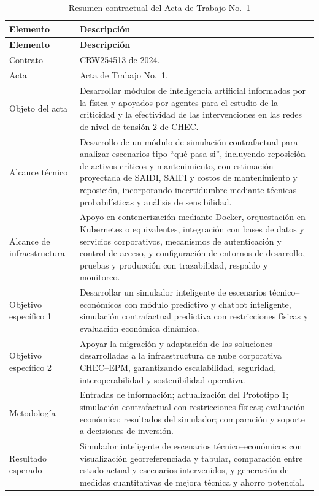 \documentclass[11pt,a4paper]{article}
\begin{document}
\begin{small}
\begin{xltabular}{\textwidth}{L{4.2cm} X}
\caption{Resumen contractual del Acta de Trabajo No.~1}
\label{tab:contractual}\\
\toprule
\textbf{Elemento} & \textbf{Descripción} \\
\midrule
\endfirsthead
\toprule
\textbf{Elemento} & \textbf{Descripción} \\
\midrule
\endhead
\bottomrule
\endfoot
Contrato & CRW254513 de 2024. \\
Acta & Acta de Trabajo No.~1. \\
Objeto del acta & Desarrollar módulos de inteligencia artificial informados por la física y apoyados por agentes para el estudio de la criticidad y la efectividad de las intervenciones en las redes de nivel de tensión 2 de CHEC. \\
Alcance técnico & Desarrollo de un módulo de simulación contrafactual para analizar escenarios tipo ``qué pasa si'', incluyendo reposición de activos críticos y mantenimiento, con estimación proyectada de SAIDI, SAIFI y costos de mantenimiento y reposición, incorporando incertidumbre mediante técnicas probabilísticas y análisis de sensibilidad. \\
Alcance de infraestructura & Apoyo en contenerización mediante Docker, orquestación en Kubernetes o equivalentes, integración con bases de datos y servicios corporativos, mecanismos de autenticación y control de acceso, y configuración de entornos de desarrollo, pruebas y producción con trazabilidad, respaldo y monitoreo. \\
Objetivo específico 1 & Desarrollar un simulador inteligente de escenarios técnico--económicos con módulo predictivo y chatbot inteligente, simulación contrafactual predictiva con restricciones físicas y evaluación económica dinámica. \\
Objetivo específico 2 & Apoyar la migración y adaptación de las soluciones desarrolladas a la infraestructura de nube corporativa CHEC--EPM, garantizando escalabilidad, seguridad, interoperabilidad y sostenibilidad operativa. \\
Metodología & Entradas de información; actualización del Prototipo 1; simulación contrafactual con restricciones físicas; evaluación económica; resultados del simulador; comparación y soporte a decisiones de inversión. \\
Resultado esperado & Simulador inteligente de escenarios técnico--económicos con visualización georreferenciada y tabular, comparación entre estado actual y escenarios intervenidos, y generación de medidas cuantitativas de mejora técnica y ahorro potencial. \\

\end{xltabular}
\end{small}
\end{document}
